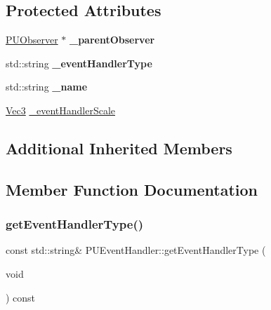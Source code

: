 \subsection*{Protected Attributes}
\begin{DoxyCompactItemize}
\item 
\mbox{\label{classPUEventHandler_a80d35fbcc1857ed5bab2b082c353f641}} 
\hyperlink{classPUObserver}{P\+U\+Observer} $\ast$ {\bfseries \+\_\+parent\+Observer}
\item 
\mbox{\label{classPUEventHandler_a988a2b47bc527d4976c7f9c38c0a3fbb}} 
std\+::string {\bfseries \+\_\+event\+Handler\+Type}
\item 
\mbox{\label{classPUEventHandler_a726834ef40476c33b0d6f46b23041221}} 
std\+::string {\bfseries \+\_\+name}
\item 
\hyperlink{classVec3}{Vec3} \hyperlink{classPUEventHandler_ae9ddbef4454b744877ca025c78d45969}{\+\_\+event\+Handler\+Scale}
\end{DoxyCompactItemize}
\subsection*{Additional Inherited Members}


\subsection{Member Function Documentation}
\mbox{\label{classPUEventHandler_ae1025b7365621e99b2b8fa257ff4583a}} 
\subsubsection{\texorpdfstring{get\+Event\+Handler\+Type()}{getEventHandlerType()}\hspace{0.1cm}{\footnotesize\ttfamily [1/2]}}
{\footnotesize\ttfamily const std\+::string\& P\+U\+Event\+Handler\+::get\+Event\+Handler\+Type (\begin{DoxyParamCaption}\item[{void}]{ }\end{DoxyParamCaption}) const\hspace{0.3cm}{\ttfamily [inline]}}

